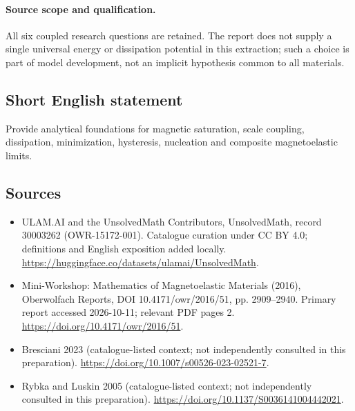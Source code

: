 \documentclass[11pt]{article}
\begin{document}
\paragraph{Source scope and qualification.}
All six coupled research questions are retained. The report does not supply a single universal energy or dissipation potential in this extraction; such a choice is part of model development, not an implicit hypothesis common to all materials.
\subsection{Short English statement}
Provide analytical foundations for magnetic saturation, scale coupling, dissipation, minimization, hysteresis, nucleation and composite magnetoelastic limits.
\subsection{Sources}
\begin{itemize}
\item[\hypertarget{source:30003262:1}{S1}] ULAM.AI and the UnsolvedMath Contributors, UnsolvedMath, record 30003262 (OWR-15172-001). Catalogue curation under CC BY 4.0; definitions and English exposition added locally.
\url{https://huggingface.co/datasets/ulamai/UnsolvedMath}.
\item[\hypertarget{source:30003262:2}{S2}] Mini-Workshop: Mathematics of Magnetoelastic Materials (2016), Oberwolfach Reports, DOI 10.4171/owr/2016/51, pp. 2909--2940. Primary report accessed 2026-10-11; relevant PDF pages 2.
\url{https://doi.org/10.4171/owr/2016/51}.
\item[\hypertarget{source:30003262:3}{S3}] Bresciani 2023 (catalogue-listed context; not independently consulted in this preparation).
\url{https://doi.org/10.1007/s00526-023-02521-7}.
\item[\hypertarget{source:30003262:4}{S4}] Rybka and Luskin 2005 (catalogue-listed context; not independently consulted in this preparation).
\url{https://doi.org/10.1137/S0036141004442021}.
\end{itemize}
\label{end:30003262}
\end{document}
